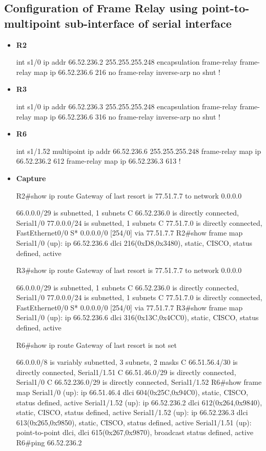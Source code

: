 \documentclass[10pt]{article}
\begin{document}
\subsection{Configuration of Frame Relay using point-to-multipoint sub-interface of serial interface}
\begin{itemize}
\item {\bf R2}
\begin{verbatim*}
int s1/0
 ip addr 66.52.236.2 255.255.255.248
 encapsulation frame-relay
 frame-relay map ip 66.52.236.6 216
 no frame-relay inverse-arp
 no shut
!
\end{verbatim*}
\item {\bf R3}
\begin{verbatim*}
int s1/0
 ip addr 66.52.236.3 255.255.255.248
 encapsulation frame-relay
 frame-relay map ip 66.52.236.6 316
 no frame-relay inverse-arp
 no shut
!
\end{verbatim*}
\item {\bf R6}
\begin{verbatim*}
int s1/1.52 multipoint
 ip addr 66.52.236.6 255.255.255.248
 frame-relay map ip 66.52.236.2 612
 frame-relay map ip 66.52.236.3 613
!
\end{verbatim*}
\item {\bf Capture}
\begin{verbatim*}
R2#show ip route
Gateway of last resort is 77.51.7.7 to network 0.0.0.0

     66.0.0.0/29 is subnetted, 1 subnets
C       66.52.236.0 is directly connected, Serial1/0
     77.0.0.0/24 is subnetted, 1 subnets
C       77.51.7.0 is directly connected, FastEthernet0/0
S*   0.0.0.0/0 [254/0] via 77.51.7.7
R2#show frame map
Serial1/0 (up): ip 66.52.236.6 dlci 216(0xD8,0x3480), static,
              CISCO, status defined, active

R3#show ip route
Gateway of last resort is 77.51.7.7 to network 0.0.0.0

     66.0.0.0/29 is subnetted, 1 subnets
C       66.52.236.0 is directly connected, Serial1/0
     77.0.0.0/24 is subnetted, 1 subnets
C       77.51.7.0 is directly connected, FastEthernet0/0
S*   0.0.0.0/0 [254/0] via 77.51.7.7
R3#show frame map
Serial1/0 (up): ip 66.52.236.6 dlci 316(0x13C,0x4CC0), static,
              CISCO, status defined, active

R6#show ip route
Gateway of last resort is not set

     66.0.0.0/8 is variably subnetted, 3 subnets, 2 masks
C       66.51.56.4/30 is directly connected, Serial1/1.51
C       66.51.46.0/29 is directly connected, Serial1/0
C       66.52.236.0/29 is directly connected, Serial1/1.52
R6#show frame map
Serial1/0 (up): ip 66.51.46.4 dlci 604(0x25C,0x94C0), static,
              CISCO, status defined, active
Serial1/1.52 (up): ip 66.52.236.2 dlci 612(0x264,0x9840), static,
              CISCO, status defined, active
Serial1/1.52 (up): ip 66.52.236.3 dlci 613(0x265,0x9850), static,
              CISCO, status defined, active
Serial1/1.51 (up): point-to-point dlci, dlci 615(0x267,0x9870), broadcast
          status defined, active
R6#ping 66.52.236.2


\end{verbatim*}
\end{itemize}
\end{document}
